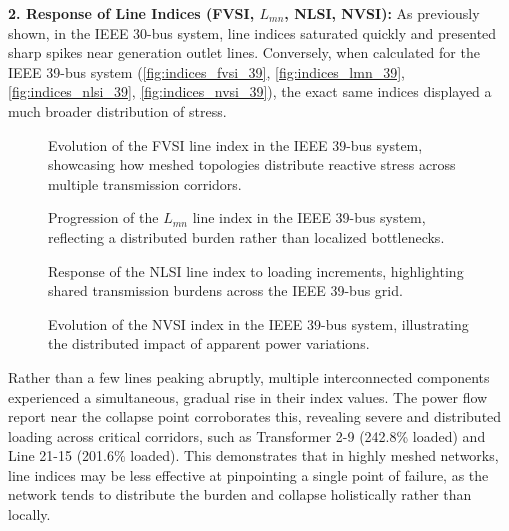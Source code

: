 \documentclass[conference]{IEEEtran}
\begin{document}
\textbf{2. Response of Line Indices (FVSI, $L_{mn}$, NLSI, NVSI):}
As previously shown, in the IEEE 30-bus system, line indices saturated quickly and presented sharp spikes near generation outlet lines. Conversely, when calculated for the IEEE 39-bus system (\autoref{fig:indices_fvsi_39}, \autoref{fig:indices_lmn_39}, \autoref{fig:indices_nlsi_39}, \autoref{fig:indices_nvsi_39}), the exact same indices displayed a much broader distribution of stress. 

\begin{figure}[htbp]
    \centering
    
    \caption{Evolution of the FVSI line index in the IEEE 39-bus system, showcasing how meshed topologies distribute reactive stress across multiple transmission corridors.}
    \label{fig:indices_fvsi_39}
\end{figure}

\begin{figure}[htbp]
    \centering
    
    \caption{Progression of the $L_{mn}$ line index in the IEEE 39-bus system, reflecting a distributed burden rather than localized bottlenecks.}
    \label{fig:indices_lmn_39}
\end{figure}

\begin{figure}[htbp]
    \centering
    
    \caption{Response of the NLSI line index to loading increments, highlighting shared transmission burdens across the IEEE 39-bus grid.}
    \label{fig:indices_nlsi_39}
\end{figure}

\begin{figure}[htbp]
    \centering
    
    \caption{Evolution of the NVSI index in the IEEE 39-bus system, illustrating the distributed impact of apparent power variations.}
    \label{fig:indices_nvsi_39}
\end{figure}

Rather than a few lines peaking abruptly, multiple interconnected components experienced a simultaneous, gradual rise in their index values. The power flow report near the collapse point corroborates this, revealing severe and distributed loading across critical corridors, such as Transformer 2-9 (242.8\% loaded) and Line 21-15 (201.6\% loaded). This demonstrates that in highly meshed networks, line indices may be less effective at pinpointing a single point of failure, as the network tends to distribute the burden and collapse holistically rather than locally.
\end{document}
